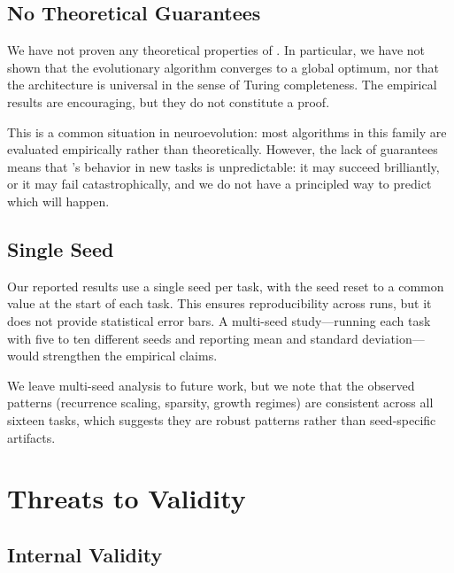 \subsection{No Theoretical Guarantees}
\label{sec:disc-theory}

We have not proven any theoretical properties of \modnet{}. In
particular, we have not shown that the evolutionary algorithm converges
to a global optimum, nor that the architecture is universal in the
sense of Turing completeness. The empirical results are encouraging,
but they do not constitute a proof.

This is a common situation in neuroevolution: most algorithms in this
family are evaluated empirically rather than theoretically. However,
the lack of guarantees means that \modnet{}'s behavior in new tasks is
unpredictable: it may succeed brilliantly, or it may fail
catastrophically, and we do not have a principled way to predict which
will happen.

\subsection{Single Seed}
\label{sec:disc-single-seed}

Our reported results use a single seed per task, with the seed reset to
a common value at the start of each task. This ensures reproducibility
across runs, but it does not provide statistical error bars. A
multi-seed study---running each task with five to ten different seeds
and reporting mean and standard deviation---would strengthen the
empirical claims.

We leave multi-seed analysis to future work, but we note that the
observed patterns (recurrence scaling, sparsity, growth regimes) are
consistent across all sixteen tasks, which suggests they are robust
patterns rather than seed-specific artifacts.

\section{Threats to Validity}
\label{sec:disc-threats}

\subsection{Internal Validity}
\label{sec:disc-internal}

